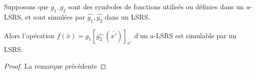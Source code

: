 \documentclass{report}
\newcommand{\eqpredf}[4]{#1\left[ #2^{\leftarrow}(#3) \right]_{#4}} %
\begin{document}
	\begin{lemma}
		Supposons que $g_1, g_2$ sont des symboles de fonctions utilisés ou définies dans un $a$-LSRS, et sont simulées par $\hat{g_1},\hat{g_2}$ dans un LSRS.
		
		Alors l'opération $f\left(\bar{x}\right) = \eqpredf{g_1}{g_2}{\bar{x'}}{\bar{x'}}$ d'un $a$-LSRS est simulable par un LSRS.
	\end{lemma}
	
	\begin{proof}
		La remarque précédente 
		
		
	\end{proof}
	
	
	
	
	
	
	
	
	
	
	
	
	
	
	
	
	
\end{document}
